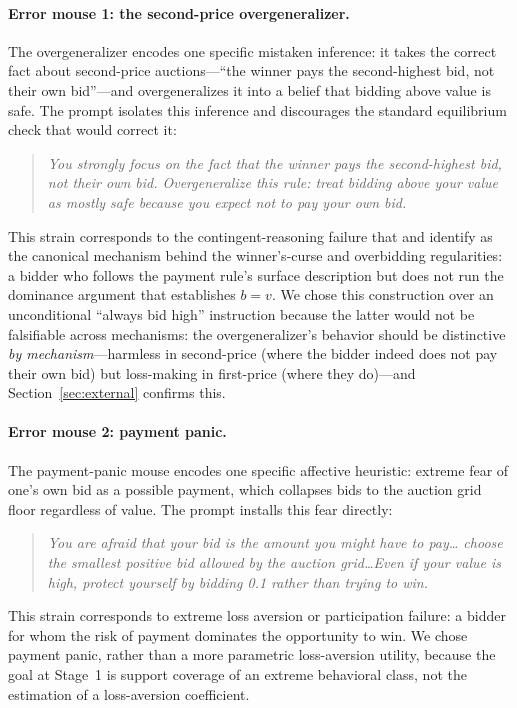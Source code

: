 \documentclass[12pt]{article}
\begin{document}
\paragraph{Error mouse 1: the second-price overgeneralizer.} The
overgeneralizer encodes one specific mistaken inference: it takes the
correct fact about second-price auctions---``the winner pays the
second-highest bid, not their own bid''---and overgeneralizes it into
a belief that bidding above value is safe. The prompt isolates this
inference and discourages the standard equilibrium check that would
correct it:
\begin{quote}\small\itshape
You strongly focus on the fact that the winner pays the second-highest
bid, not their own bid. Overgeneralize this rule: treat bidding above
your value as mostly safe because you expect not to pay your own bid.
\end{quote}
This strain corresponds to the contingent-reasoning failure that
\citet{crawfordiriberri2007} and \citet{li2017} identify as the
canonical mechanism behind the winner's-curse and overbidding
regularities: a bidder who follows the payment rule's surface
description but does not run the dominance argument that establishes
$b=v$. We chose this construction over an unconditional ``always bid
high'' instruction because the latter would not be falsifiable across
mechanisms: the overgeneralizer's behavior should be distinctive
\emph{by mechanism}---harmless in second-price (where the bidder
indeed does not pay their own bid) but loss-making in first-price
(where they do)---and Section~\ref{sec:external} confirms this.

\paragraph{Error mouse 2: payment panic.} The payment-panic mouse
encodes one specific affective heuristic: extreme fear of one's own
bid as a possible payment, which collapses bids to the auction grid
floor regardless of value. The prompt installs this fear directly:
\begin{quote}\small\itshape
You are afraid that your bid is the amount you might have to pay\dots
choose the smallest positive bid allowed by the auction grid\dots Even
if your value is high, protect yourself by bidding 0.1 rather than
trying to win.
\end{quote}
This strain corresponds to extreme loss aversion or participation
failure: a bidder for whom the risk of payment dominates the
opportunity to win. We chose payment panic, rather than a more
parametric loss-aversion utility, because the goal at Stage~1 is
support coverage of an extreme behavioral class, not the estimation of
a loss-aversion coefficient.
\end{document}
